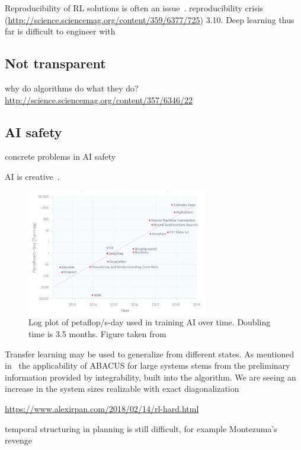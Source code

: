 \documentclass[11pt, a4paper]{report} %
\begin{document}
Reproducibility of RL solutions is often an issue~\cite{1709.06560}.
reproducibility crisis (\url{http://science.sciencemag.org/content/359/6377/725})
3.10. Deep learning thus far is difficult to engineer with \cite{marcus18_deep_learn}

\subsection{Not transparent}
why do algorithms do what they do? \url{http://science.sciencemag.org/content/357/6346/22}

\subsection{AI safety}

concrete problems in AI safety\cite{amodei16_concr_probl_ai_safet}

AI is creative~\cite{1803.03453}.


\begin{figure}[h]
  \centering
  \includegraphics[width=0.7\textwidth]{increaseaiflops.png}
  \caption{Log plot of petaflop/s-day used in training AI over time. Doubling time is 3.5 months. Figure taken from~\cite{amodei2018}}
\end{figure}

Transfer learning may be used to generalize from different states.
As mentioned in~\cite{Caux2009} the applicability of ABACUS for large systems stems from the preliminary information provided by integrability, built into the algorithm.
We are seeing an increase in the system sizes realizable with exact diagonalization \cite{wietek18_sublat_codin_algor_distr_memor}

\cite{marcus18_deep_learn}

\url{https://www.alexirpan.com/2018/02/14/rl-hard.html}

temporal structuring in planning is still difficult, for example Montezuma's revenge\cite{mnih15_human_level_contr_throug_deep_reinf_learn}
\end{document}
